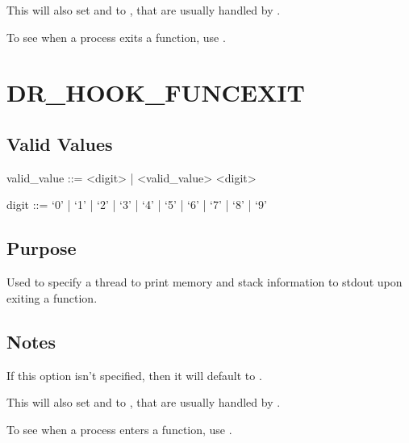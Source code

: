 \documentclass[letterpaper,10pt,english]{sphinxmanual}
\begin{document}
\sphinxAtStartPar
This will also set  and  to , that are usually handled by {\hyperref[\detokenize{flag/flag:dr-hook-opt}]{}}.

\sphinxAtStartPar
To see when a process exits a function, use {\hyperref[\detokenize{flag/flag:dr-hook-funcexit}]{}}.


\section{DR\_HOOK\_FUNCEXIT}
\label{\detokenize{flag/flag:dr-hook-funcexit}}\label{\detokenize{flag/flag:id85}}

\subsection{Valid Values}
\label{\detokenize{flag/flag:id86}}
\begin{DUlineblock}{0em}
\item[] valid\_value ::= \textless{}digit\textgreater{} | \textless{}valid\_value\textgreater{} \textless{}digit\textgreater{}
\item[] digit ::= ‘0’ | ‘1’ | ‘2’ | ‘3’ | ‘4’ | ‘5’ | ‘6’ | ‘7’ | ‘8’ | ‘9’
\end{DUlineblock}


\subsection{Purpose}
\label{\detokenize{flag/flag:id87}}
\sphinxAtStartPar
Used to specify a thread to print memory and stack information to stdout upon exiting a function.


\subsection{Notes}
\label{\detokenize{flag/flag:id88}}
\sphinxAtStartPar
If this option isn’t specified, then it will default to .

\sphinxAtStartPar
This will also set  and  to , that are usually handled by {\hyperref[\detokenize{flag/flag:dr-hook-opt}]{}}.

\sphinxAtStartPar
To see when a process enters a function, use {\hyperref[\detokenize{flag/flag:dr-hook-funcenter}]{}}.
\end{document}
